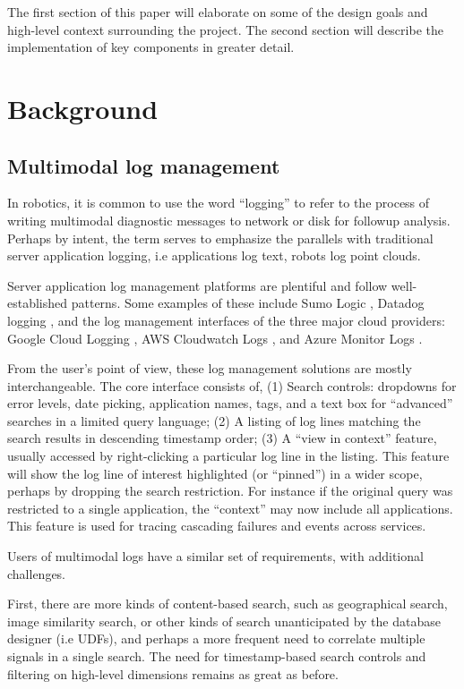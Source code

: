 \documentclass[9pt,twocolumn]{article}
\newcommand{\q}[1]{``#1''}
\begin{document}
    The first section of this paper will elaborate on some of the design goals and
    high-level context surrounding the project. The second section will describe
    the implementation of key components in greater detail.

    \section{Background}
    \subsection{Multimodal log management}
    In robotics, it is common to use the word \q{logging} to refer to the process of
    writing multimodal diagnostic messages to network or disk for followup
    analysis. Perhaps by intent, the term serves to emphasize the parallels with
    traditional server application logging, i.e applications log text, robots log
    point clouds.

    Server application log management platforms are plentiful and follow
    well-established patterns. Some examples of these include Sumo Logic
    \cite{sumologic}, Datadog logging \cite{datadoglog}, and the log management
    interfaces of the three major cloud providers: Google Cloud Logging \cite{gcplog}, AWS
    Cloudwatch Logs \cite{cloudwatch}, and Azure Monitor Logs \cite{azlog}.

    From the user’s point of view, these log management solutions are mostly
    interchangeable. The core interface consists of, (1) Search controls:
    dropdowns for error levels, date picking, application names, tags, and a
    text box for \q{advanced} searches in a limited query language; (2) A
    listing of log lines matching the search results in descending timestamp
    order; (3) A \q{view in context} feature, usually accessed by
    right-clicking a particular log line in the listing. This feature will
    show the log line of interest highlighted (or \q{pinned}) in a wider scope,
    perhaps by dropping the search restriction. For instance if the original
    query was restricted to a single application, the \q{context} may now
    include all applications. This feature is used for tracing cascading
    failures and events across services.

    Users of multimodal logs have a similar set of requirements, with additional
    challenges.

    First, there are more kinds of content-based search, such as geographical
    search, image similarity search, or other kinds of search unanticipated by
    the database designer (i.e UDFs), and perhaps a more frequent need to
    correlate multiple signals in a single search. The need for timestamp-based
    search controls and filtering on high-level dimensions remains as great as
    before.
\end{document}
